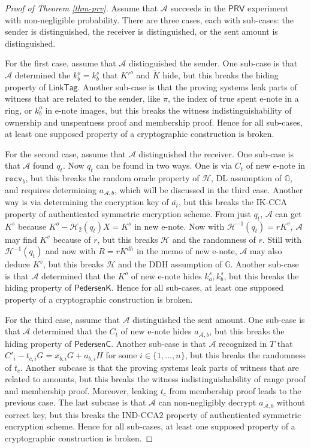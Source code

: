 \documentclass{article}
\theoremstyle{plain}
\theoremstyle{remark}
\begin{document}
\begin{proof}[Proof of Theorem \ref{thm-prv}]
Assume that $\mathcal{A}$ succeeds in the $\textsf{PRV}$ experiment with non-negligible probability. There are three cases, each with sub-cases: the sender is distinguished, the receiver is distinguished, or the sent amount is distinguished.

For the first case, assume that $\mathcal{A}$ distinguished the sender. One sub-case is that $\mathcal{A}$ determined the $k_b^o = k_b^s$ that $K'^o$ and $\tilde{K}$ hide, but this breaks the hiding property of $\textsf{LinkTag}$. Another sub-case is that the proving systems leak parts of witness that are related to the sender, like $\pi$, the index of true spent e-note in a ring, or $k_b^o$ in e-note images, but this breaks the witness indistinguishability of ownership and unspentness proof and membership proof. Hence for all sub-cases, at least one supposed property of a cryptographic construction is broken.

For the second case, assume that $\mathcal{A}$ distinguished the receiver. One sub-case is that $\mathcal{A}$ found $q_t$. Now $q_t$ can be found in two ways. One is via $C_t$ of new e-note in $\texttt{recv}_b$, but this breaks the random oracle property of  $\mathcal{H}$, DL assumption of $\mathbb{G}$, and requires determining $a_{\mathcal{A},b}$, which will be discussed in the third case. Another way is via determining the encryption key of $\overline{a_t}$, but this breaks the IK-CCA property of authenticated symmetric encryption scheme. From just $q_t$, $\mathcal{A}$ can get $K^s$ because $K^o - \mathcal{H}_2(q_t)X = K^s$ in new e-note. Now with $\mathcal{H}^{-1}(q_t) = r K^{v}$, $\mathcal{A}$ may find $K^v$ because of $r$, but this breaks $\mathcal{H}$ and the randomness of $r$. Still with $\mathcal{H}^{-1}(q_t)$ and now with $R = r K^{dh}$ in the memo of new e-note, $\mathcal{A}$ may also deduce $K^v$, but this breaks $\mathcal{H}$ and the DDH assumption of $\mathbb{G}$. Another sub-case is that $\mathcal{A}$ determined that the $K^o$ of new e-note hides $k_a^s, k_b^s$, but this breaks the hiding property of $\textsf{PedersenK}$. Hence for all sub-cases, at least one supposed property of a cryptographic construction is broken.

For the third case, assume that $\mathcal{A}$ distinguished the sent amount. One sub-case is that $\mathcal{A}$ determined that the $C_t$ of new e-note hides $a_{\mathcal{A}, b}$, but this breaks the hiding property of $\textsf{PedersenC}$. Another sub-case is that $\mathcal{A}$ recognized in $T$ that $C'_i - t_{c, i}G = x_{b,i}G + a_{b,i}H$ for some $i \in \{1, \ldots, n\}$, but this breaks the randomness of $t_c$. Another subcase is that the proving systems leak parts of witness that are related to amounts, but this breaks the witness indistinguishability of range proof and membership proof. Moreover, leaking $t_c$ from membership proof leads to the previous case. The last subcase is that $\mathcal{A}$ can non-negligibly decrypt $\overline{a_{\mathcal{A},b}}$ without correct key, but this breaks the IND-CCA2 property of authenticated symmetric encryption scheme. Hence for all sub-cases, at least one supposed property of a cryptographic construction is broken.
\end{proof}
\end{document}

